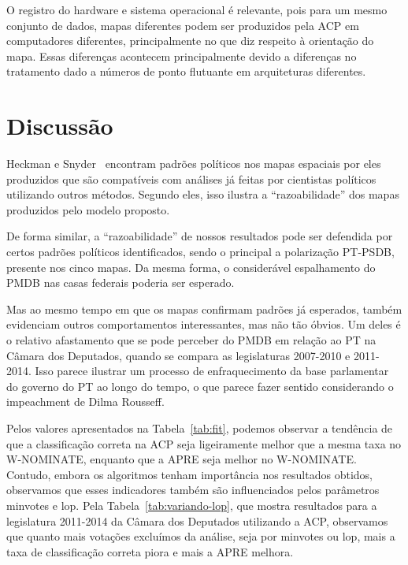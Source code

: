 \documentclass[a4paper, 12pt]{article}
\newcommand\wnominate{W-NOMINATE\xspace}
\begin{document}
O registro do hardware e sistema operacional é relevante, pois para um mesmo conjunto de dados, mapas diferentes podem ser produzidos pela ACP em computadores diferentes, principalmente no que diz respeito à orientação do mapa. Essas diferenças acontecem principalmente devido a diferenças no tratamento dado a números de ponto flutuante em arquiteturas diferentes.

\section{Discussão}
\label{sec:discussao}

Heckman e Snyder~\cite{heckman-snyder1997} encontram padrões políticos nos mapas espaciais por eles produzidos que são compatíveis com análises já feitas por cientistas políticos utilizando outros métodos. Segundo eles, isso ilustra a ``razoabilidade'' dos mapas produzidos pelo modelo proposto. 

De forma similar, a ``razoabilidade'' de nossos resultados pode ser defendida por certos padrões políticos identificados, sendo o principal a polarização PT-PSDB, presente nos cinco mapas. Da mesma forma, o considerável espalhamento do PMDB nas casas federais poderia ser esperado.

Mas ao mesmo tempo em que os mapas confirmam padrões já esperados, também evidenciam outros comportamentos interessantes, mas não tão óbvios. Um deles é o relativo afastamento que se pode perceber do PMDB em relação ao PT na Câmara dos Deputados, quando se compara as legislaturas 2007-2010 e 2011-2014. Isso parece ilustrar um processo de enfraquecimento da base parlamentar do governo do PT ao longo do tempo, o que parece fazer sentido considerando o impeachment de Dilma Rousseff.

Pelos valores apresentados na Tabela~\ref{tab:fit}, podemos observar a tendência de que a classificação correta na ACP seja ligeiramente melhor que a mesma taxa no \wnominate, enquanto que a APRE seja melhor no \wnominate. Contudo, embora os algoritmos tenham importância nos resultados obtidos, observamos que esses indicadores também são influenciados pelos parâmetros \textsf{minvotes} e \textsf{lop}. Pela Tabela~\ref{tab:variando-lop}, que mostra resultados para a legislatura 2011-2014 da Câmara dos Deputados utilizando a ACP, observamos que quanto mais votações excluímos da análise, seja por \textsf{minvotes} ou \textsf{lop}, mais a taxa de classificação correta piora e mais a APRE melhora.
\end{document}
